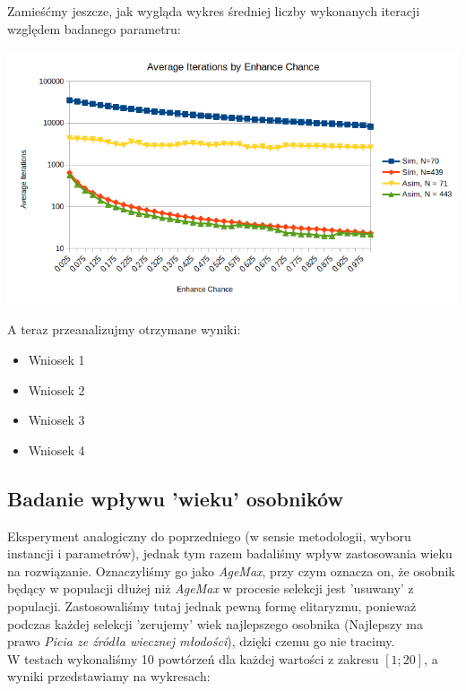 \documentclass{article}
\begin{document}
Zamieśćmy jeszcze, jak wygląda wykres średniej liczby wykonanych iteracji względem badanego parametru:

\includegraphics[scale=0.72]{locEnhIter}

A teraz przeanalizujmy otrzymane wyniki:
\begin{itemize}
	\item Wniosek 1
	\item Wniosek 2
	\item Wniosek 3
	\item Wniosek 4
\end{itemize}

\subsection{Badanie wpływu 'wieku' osobników}
Eksperyment analogiczny do poprzedniego (w sensie metodologii, wyboru instancji i parametrów), jednak tym razem badaliśmy wpływ zastosowania wieku na rozwiązanie. Oznaczyliśmy go jako \textit{AgeMax}, przy czym oznacza on, że osobnik będący w populacji dłużej niż \textit{AgeMax} w procesie selekcji jest 'usuwany' z populacji. Zastosowaliśmy tutaj jednak pewną formę elitaryzmu, ponieważ podczas każdej selekcji 'zerujemy' wiek najlepszego osobnika (Najlepszy ma prawo \textit{Picia ze źródła wiecznej młodości}), dzięki czemu go nie tracimy.\\
W testach wykonaliśmy 10 powtórzeń dla każdej wartości z zakresu $[1 ; 20]$, a wyniki przedstawiamy na wykresach:
\end{document}

